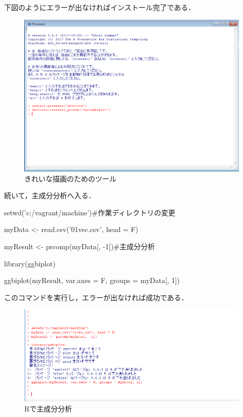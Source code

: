 下図のようにエラーが出なければインストール完了である．

\begin{figure}[htb]
\centering
\includegraphics[width=13cm]{4-36.png}
\caption{きれいな描画のためのツール}\label{4-36}
\end{figure}
\newpage

続いて，主成分分析へ入る．

setwd('c:/vagrant/machine')\#作業ディレクトリの変更

myData <- read.csv('01vec.csv', head = F)

myResult <- prcomp(myData[, -1])\#主成分分析

library(ggbiplot)

ggbiplot(myResult, var.axes = F, groups = myData[, 1])

このコマンドを実行し，エラーが出なければ成功である．

\begin{figure}[htb]
\centering
\includegraphics[width=13cm]{4-37.png}
\caption{Rで主成分分析}\label{4-37}
\end{figure}
\newpage

